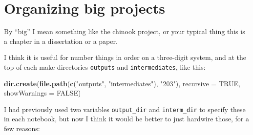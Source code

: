 \documentclass[]{krantz}
\makeatletter
\newenvironment{Shaded}{\begin{snugshade}}{\end{snugshade}}
\newcommand{\DataTypeTok}[1]{\textcolor[rgb]{0.27,0.27,0.27}{#1}}
\newcommand{\KeywordTok}[1]{\textcolor[rgb]{0.27,0.27,0.27}{\textbf{#1}}}
\newcommand{\NormalTok}[1]{#1}
\newcommand{\OtherTok}[1]{\textcolor[rgb]{0.37,0.37,0.37}{#1}}
\newcommand{\StringTok}[1]{\textcolor[rgb]{0.5,0.5,0.5}{#1}}
\newenvironment{kframe}{%
\medskip{}
\setlength{\fboxsep}{.8em}
 \def\at@end@of@kframe{}%
 \ifinner\ifhmode%
  \def\at@end@of@kframe{\end{minipage}}%
  \begin{minipage}{\columnwidth}%
 \fi\fi%
 \def\FrameCommand##1{\hskip\@totalleftmargin \hskip-\fboxsep
 \colorbox{shadecolor}{##1}\hskip-\fboxsep
     \hskip-\linewidth \hskip-\@totalleftmargin \hskip\columnwidth}%
 \MakeFramed {\advance\hsize-\width
   \@totalleftmargin\z@ \linewidth\hsize
   \@setminipage}}%
 {\par\unskip\endMakeFramed%
 \at@end@of@kframe}
\renewenvironment{Shaded}{\begin{kframe}}{\end{kframe}}
\makeatother
\begin{document}
\hypertarget{organizing-big-projects}{%
\section{Organizing big projects}\label{organizing-big-projects}}

By ``big'' I mean something like the chinook project, or your typical thing this is
a chapter in a dissertation or a paper.

I think it is useful for number things in order on a three-digit system, and
at the top of each make directories \texttt{outputs} and \texttt{intermediates}, like this:

\begin{Shaded}
\begin{Highlighting}[]
\KeywordTok{dir.create}\NormalTok{(}\KeywordTok{file.path}\NormalTok{(}\KeywordTok{c}\NormalTok{(}\StringTok{"outputs"}\NormalTok{, }\StringTok{"intermediates"}\NormalTok{), }\StringTok{"203"}\NormalTok{), }\DataTypeTok{recursive =} \OtherTok{TRUE}\NormalTok{, }\DataTypeTok{showWarnings =} \OtherTok{FALSE}\NormalTok{)}
\end{Highlighting}
\end{Shaded}

I had previously used two variables \texttt{output\_dir} and \texttt{interm\_dir} to specify these in each
notebook, but now I think it would be better to just hardwire those, for a few reasons:
\end{document}
